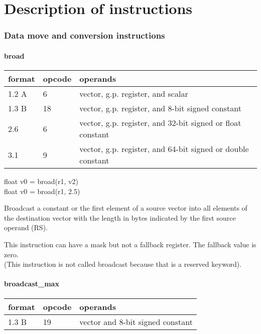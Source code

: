 \documentclass[forwardcom.tex]{subfiles}
\begin{document}
\RaggedRight

\chapter{Description of instructions}\label{chap:DescriptionOfInstructions}

\subsection{Data move and conversion instructions}

\subsubsection{broad}

\label{table:broadInstruction}
\begin{tabular}{|p{12mm}|p{12mm}|p{110mm}|}
\hline
\bfseries format & \bfseries opcode & \bfseries operands \\ \hline
1.2 A &  6 & vector, g.p. register, and scalar \\ \hline
1.3 B & 18 & vector, g.p. register, and 8-bit signed constant \\ \hline
2.6   &  6 & vector, g.p. register, and 32-bit signed or float constant \\ \hline
3.1   &  9 & vector, g.p. register, and 64-bit signed or double constant \\ \hline
\end{tabular}
\vspace{2mm}

float v0 = broad(r1, v2)\\
float v0 = broad(r1, 2.5)
\vspace{2mm}

Broadcast a constant or the first element of a source vector into all
elements of the destination vector with the length in bytes indicated by the first source operand (RS).
\vspace{2mm}

This instruction can have a mask but not a fallback register. The fallback value is zero.\\
(This instruction is not called broadcast because that is a reserved keyword).


\subsubsection{broadcast\_max}

\label{table:broadcastMaxInstruction}
\begin{tabular}{|p{12mm}|p{12mm}|p{110mm}|}
\hline
\bfseries format & \bfseries opcode & \bfseries operands \\ \hline
1.3 B & 19 & vector and 8-bit signed constant \\ \hline
\end{tabular}
\vspace{2mm}
\end{document}
